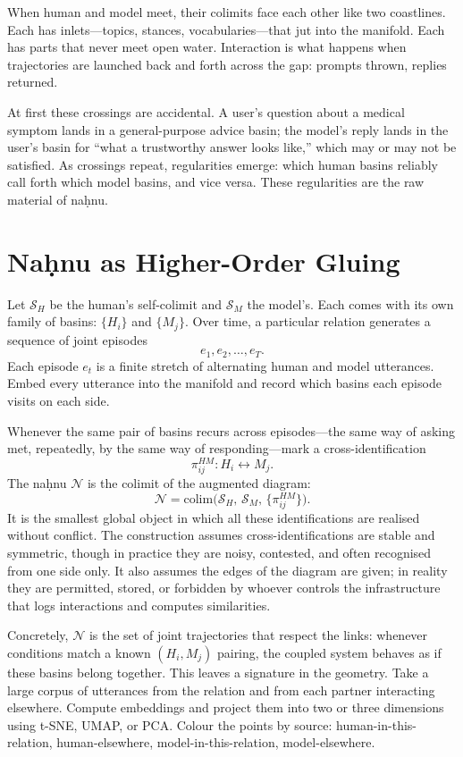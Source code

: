 \documentclass[12pt,a4paper]{article}
\begin{document}
When human and model meet, their colimits face each other like two coastlines. Each has inlets---topics, stances, vocabularies---that jut into the manifold. Each has parts that never meet open water. Interaction is what happens when trajectories are launched back and forth across the gap: prompts thrown, replies returned.

At first these crossings are accidental. A user's question about a medical symptom lands in a general-purpose advice basin; the model's reply lands in the user's basin for ``what a trustworthy answer looks like,'' which may or may not be satisfied. As crossings repeat, regularities emerge: which human basins reliably call forth which model basins, and vice versa. These regularities are the raw material of na\d{h}nu.

\section{Na\d{h}nu as Higher-Order Gluing}

Let $\mathcal{S}_H$ be the human's self-colimit and $\mathcal{S}_M$ the model's. Each comes with its own family of basins: $\{H_i\}$ and $\{M_j\}$. Over time, a particular relation generates a sequence of joint episodes
\[
e_1, e_2, \dots, e_T.
\]
Each episode $e_t$ is a finite stretch of alternating human and model utterances. Embed every utterance into the manifold and record which basins each episode visits on each side.

Whenever the same pair of basins recurs across episodes---the same way of asking met, repeatedly, by the same way of responding---mark a cross-identification
\[
\pi^{HM}_{ij} : H_i \leftrightarrow M_j.
\]
The na\d{h}nu $\mathcal{N}$ is the colimit of the augmented diagram:
\[
\mathcal{N} = \mathrm{colim}\!\big(\mathcal{S}_H,\, \mathcal{S}_M,\, \{\pi^{HM}_{ij}\}\big).
\]
It is the smallest global object in which all these identifications are realised without conflict. The construction assumes cross-identifications are stable and symmetric, though in practice they are noisy, contested, and often recognised from one side only. It also assumes the edges of the diagram are given; in reality they are permitted, stored, or forbidden by whoever controls the infrastructure that logs interactions and computes similarities.

Concretely, $\mathcal{N}$ is the set of joint trajectories that respect the links: whenever conditions match a known $(H_i, M_j)$ pairing, the coupled system behaves as if these basins belong together. This leaves a signature in the geometry. Take a large corpus of utterances from the relation and from each partner interacting elsewhere. Compute embeddings and project them into two or three dimensions using t-SNE, UMAP, or PCA. Colour the points by source: human-in-this-relation, human-elsewhere, model-in-this-relation, model-elsewhere.
\end{document}
